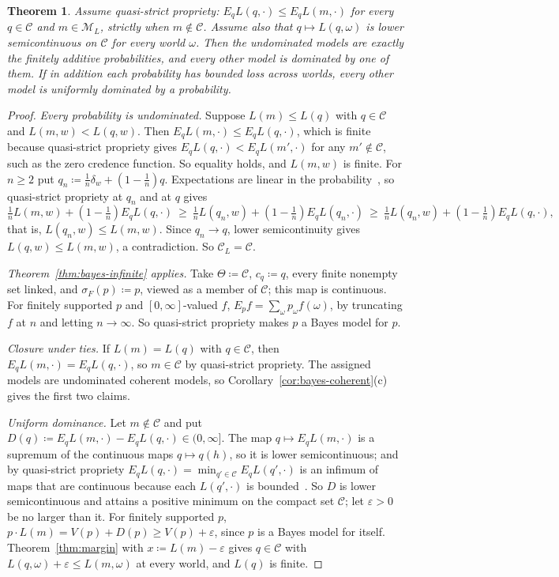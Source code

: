 \documentclass[11pt]{article}
\newtheorem{theorem}{Theorem}[section]
\theoremstyle{definition}
\theoremstyle{remark}
\newcommand{\M}{\mathcal M}
\newcommand{\C}{\mathcal C}
\begin{document}
\begin{theorem}\label{thm:nielsen}
Assume \emph{quasi-strict propriety}: $E_qL(q,\cdot)\le E_qL(m,\cdot)$ for every $q\in\C$ and $m\in\M_L$, strictly when $m\notin\C$. Assume also that $q\mapsto L(q,\omega)$ is lower semicontinuous on $\C$ for every world $\omega$. Then the undominated models are exactly the finitely additive probabilities, and every other model is dominated by one of them. If in addition each probability has bounded loss across worlds, every other model is uniformly dominated by a probability.
\end{theorem}
\begin{proof}
\emph{Every probability is undominated.} Suppose $L(m)\le L(q)$ with $q\in\C$ and $L(m,w)<L(q,w)$. Then $E_qL(m,\cdot)\le E_qL(q,\cdot)$, which is finite because quasi-strict propriety gives $E_qL(q,\cdot)<E_qL(m',\cdot)$ for any $m'\notin\C$, such as the zero credence function. So equality holds, and $L(m,w)$ is finite. For $n\ge2$ put $q_n\coloneqq\frac1n\delta_w+(1-\frac1n)q$. Expectations are linear in the probability~\cite[Appendix~A, Proposition~1]{Nielsen}, so quasi-strict propriety at $q_n$ and at $q$ gives
\[
\tfrac1nL(m,w)+(1-\tfrac1n)E_qL(q,\cdot)\ \ge\ \tfrac1nL(q_n,w)+(1-\tfrac1n)E_qL(q_n,\cdot)\ \ge\ \tfrac1nL(q_n,w)+(1-\tfrac1n)E_qL(q,\cdot),
\]
that is, $L(q_n,w)\le L(m,w)$. Since $q_n\to q$, lower semicontinuity gives $L(q,w)\le L(m,w)$, a contradiction. So $\C_L=\C$.

\emph{Theorem~\ref{thm:bayes-infinite} applies.} Take $\Theta\coloneqq\C$, $c_q\coloneqq q$, every finite nonempty set linked, and $\sigma_F(p)\coloneqq p$, viewed as a member of $\C$; this map is continuous. For finitely supported $p$ and $[0,\infty]$-valued $f$, $E_pf=\sum_\omega p_\omega f(\omega)$, by truncating $f$ at $n$ and letting $n\to\infty$. So quasi-strict propriety makes $p$ a Bayes model for $p$.

\emph{Closure under ties.} If $L(m)=L(q)$ with $q\in\C$, then $E_qL(m,\cdot)=E_qL(q,\cdot)$, so $m\in\C$ by quasi-strict propriety. The assigned models are undominated coherent models, so Corollary~\ref{cor:bayes-coherent}(c) gives the first two claims.

\emph{Uniform dominance.} Let $m\notin\C$ and put $D(q)\coloneqq E_qL(m,\cdot)-E_qL(q,\cdot)\in(0,\infty]$. The map $q\mapsto E_qL(m,\cdot)$ is a supremum of the continuous maps $q\mapsto q(h)$, so it is lower semicontinuous; and by quasi-strict propriety $E_qL(q,\cdot)=\min_{q'\in\C}E_qL(q',\cdot)$ is an infimum of maps that are continuous because each $L(q',\cdot)$ is bounded~\cite[Lemmas~1 and~3]{Nielsen}. So $D$ is lower semicontinuous and attains a positive minimum on the compact set $\C$; let $\varepsilon>0$ be no larger than it. For finitely supported $p$, $p\cdot L(m)=V(p)+D(p)\ge V(p)+\varepsilon$, since $p$ is a Bayes model for itself. Theorem~\ref{thm:margin} with $x\coloneqq L(m)-\varepsilon$ gives $q\in\C$ with $L(q,\omega)+\varepsilon\le L(m,\omega)$ at every world, and $L(q)$ is finite.
\end{proof}
\end{document}

